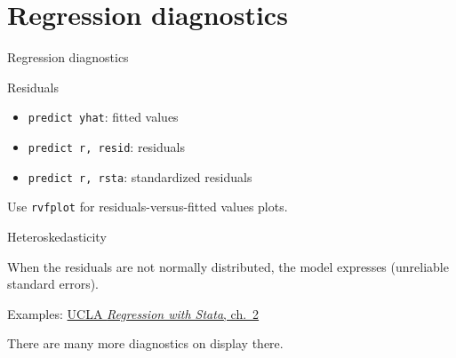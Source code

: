 \documentclass[t]{beamer}
\begin{document}
	\section{Regression diagnostics}

	\begin{frame}[t]{Regression diagnostics}

		\begin{block}{Residuals}

			\begin{itemize}
				\item \texttt{predict yhat}: fitted values
				\item \texttt{predict r, resid}: residuals
				\item \texttt{predict r, rsta}: standardized residuals		
			\end{itemize}
			
			Use \texttt{rvfplot} for residuals-versus-fitted values plots.

		\end{block}

		\begin{alertblock}{Heteroskedasticity}

			When the residuals are not normally distributed, the model expresses  (unreliable standard errors).

		\end{alertblock}

		\begin{exampleblock}{Examples: \href{http://www.ats.ucla.edu/stat/stata/webbooks/reg/chapter2/statareg2.htm}{UCLA \textit{Regression with Stata}, ch.~2}}

			There are many more diagnostics on display there.

		\end{exampleblock}
		
	\end{frame}

    	
\end{document}
